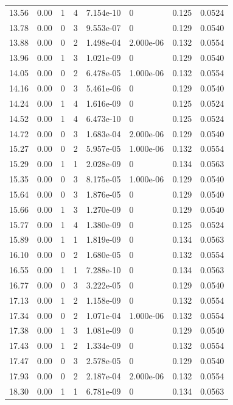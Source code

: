 \documentclass[preview]{standalone}
\begin{document}
{{{\begin{tabular}{L{1.2cm}C{1.2cm} C{0.3cm}C{0.5cm} C{1.4cm}C{1.4cm} C{1.4cm}C{1.4cm}}
  13.56  &  0.00  & 1     &  4 &  7.154e-10  & 0  & 0.125 &  0.0524   \\ 
  13.78  &  0.00  & 0     &  3 &  9.553e-07  & 0  & 0.129 &  0.0540   \\ 
  13.88  &  0.00  & 0     &  2 &  1.498e-04  & 2.000e-06  & 0.132 &  0.0554   \\ 
  13.96  &  0.00  & 1     &  3 &  1.021e-09  & 0  & 0.129 &  0.0540   \\ 
  14.05  &  0.00  & 0     &  2 &  6.478e-05  & 1.000e-06  & 0.132 &  0.0554   \\ 
  14.16  &  0.00  & 0     &  3 &  5.461e-06  & 0  & 0.129 &  0.0540   \\ 
  14.24  &  0.00  & 1     &  4 &  1.616e-09  & 0  & 0.125 &  0.0524   \\ 
  14.52  &  0.00  & 1     &  4 &  6.473e-10  & 0  & 0.125 &  0.0524   \\ 
  14.72  &  0.00  & 0     &  3 &  1.683e-04  & 2.000e-06  & 0.129 &  0.0540   \\ 
  15.27  &  0.00  & 0     &  2 &  5.957e-05  & 1.000e-06  & 0.132 &  0.0554   \\ 
  15.29  &  0.00  & 1     &  1 &  2.028e-09  & 0  & 0.134 &  0.0563   \\ 
  15.35  &  0.00  & 0     &  3 &  8.175e-05  & 1.000e-06  & 0.129 &  0.0540   \\ 
  15.64  &  0.00  & 0     &  3 &  1.876e-05  & 0  & 0.129 &  0.0540   \\ 
  15.66  &  0.00  & 1     &  3 &  1.270e-09  & 0  & 0.129 &  0.0540   \\ 
  15.77  &  0.00  & 1     &  4 &  1.380e-09  & 0  & 0.125 &  0.0524   \\ 
  15.89  &  0.00  & 1     &  1 &  1.819e-09  & 0  & 0.134 &  0.0563   \\ 
  16.10  &  0.00  & 0     &  2 &  1.680e-05  & 0  & 0.132 &  0.0554   \\ 
  16.55  &  0.00  & 1     &  1 &  7.288e-10  & 0  & 0.134 &  0.0563   \\ 
  16.77  &  0.00  & 0     &  3 &  3.222e-05  & 0  & 0.129 &  0.0540   \\ 
  17.13  &  0.00  & 1     &  2 &  1.158e-09  & 0  & 0.132 &  0.0554   \\ 
  17.34  &  0.00  & 0     &  2 &  1.071e-04  & 1.000e-06  & 0.132 &  0.0554   \\ 
  17.38  &  0.00  & 1     &  3 &  1.081e-09  & 0  & 0.129 &  0.0540   \\ 
  17.43  &  0.00  & 1     &  2 &  1.334e-09  & 0  & 0.132 &  0.0554   \\ 
  17.47  &  0.00  & 0     &  3 &  2.578e-05  & 0  & 0.129 &  0.0540   \\ 
  17.93  &  0.00  & 0     &  2 &  2.187e-04  & 2.000e-06  & 0.132 &  0.0554   \\ 
  18.30  &  0.00  & 1     &  1 &  6.781e-09  & 0  & 0.134 &  0.0563   \\ 
\hline 
\end{tabular} 

}}}
\end{document}
